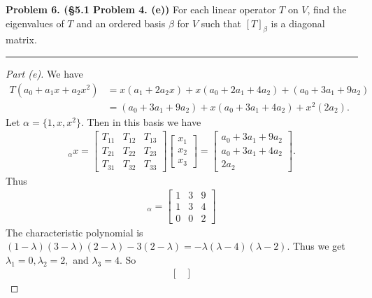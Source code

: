 \documentclass[leqno]{article}
\theoremstyle{nonumberplain}
\newtheorem{proof}{Proof}
\begin{document}
\pagebreak




\noindent\textbf{Problem 6. (\S 5.1 Problem 4. (e))} For each linear operator $T$ on $V$, find the eigenvalues of $T$ and an ordered basis $\beta$ for $V$ such that $[T]_\beta$ is a diagonal matrix.

\noindent\rule[0.5ex]{\linewidth}{1pt}

\begin{proof}[Part (e)]
We have
\begin{align*}
T(a_0+a_1x+a_2x^2)&=x(a_1+2a_2x)+x(a_0+2a_1+4a_2)+(a_0+3a_1+9a_2)\\
&= (a_0+3a_1+9a_2)+x(a_0+3a_1+4a_2)+x^2(2a_2).
\end{align*}
Let $\alpha=\{1,x,x^2\}$. Then in this basis we have
\begin{align*}
[T]_\alpha x = 
\begin{bmatrix}
T_{11} & T_{12} & T_{13}\\
T_{21} & T_{22} & T_{23}\\
T_{31} & T_{32} & T_{33}
\end{bmatrix}
\begin{bmatrix}
x_1\\
x_2\\
x_3
\end{bmatrix}=
\begin{bmatrix}
a_0+3a_1+9a_2\\
a_0+3a_1+4a_2\\
2a_2
\end{bmatrix}.
\end{align*}
Thus
\begin{align*}
[T]_\alpha = \begin{bmatrix}
1 & 3 & 9\\
1 & 3 & 4\\
0 & 0 & 2
\end{bmatrix}
\end{align*}
The characteristic polynomial is $(1-\lambda)(3-\lambda)(2-\lambda)-3(2-\lambda)=-\lambda(\lambda-4)(\lambda-2)$.  Thus we get $\lambda_1=0,\lambda_2=2,$ and $\lambda_3=4$.  So
\begin{align*}
\begin{bmatrix}

\end{bmatrix}
\end{align*}
\end{proof}
\end{document}
